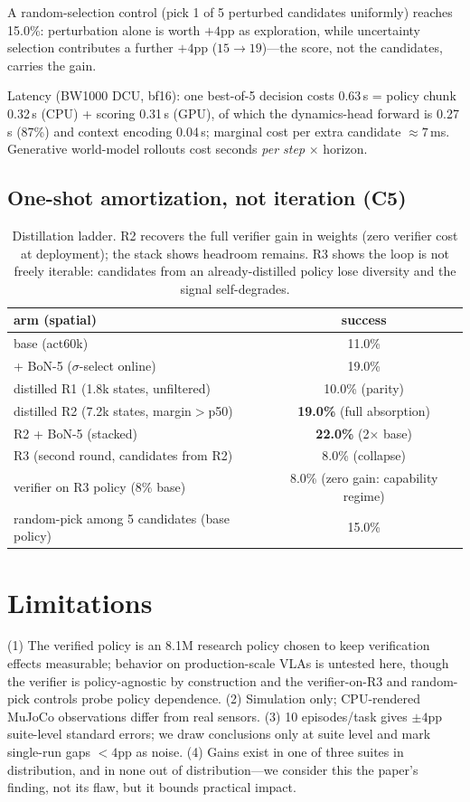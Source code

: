 \documentclass[11pt]{article}
\begin{document}
A random-selection control (pick 1 of 5 perturbed candidates uniformly) reaches 15.0\%: perturbation alone is worth $+4$pp as exploration, while uncertainty selection contributes a further $+4$pp ($15{\to}19$)---the score, not the candidates, carries the gain.

Latency (BW1000 DCU, bf16): one best-of-5 decision costs 0.63\,s = policy chunk 0.32\,s (CPU) + scoring 0.31\,s (GPU), of which the dynamics-head forward is 0.27\,s (87\%) and context encoding 0.04\,s; marginal cost per extra candidate $\approx 7$\,ms. Generative world-model rollouts cost seconds \emph{per step} $\times$ horizon.

\subsection{One-shot amortization, not iteration (C5)}
\begin{table}[h]
\centering\small
\begin{tabular}{lc}
\toprule
arm (spatial) & success \\
\midrule
base (act60k) & 11.0\% \\
+ BoN-5 ($\sigma$-select online) & 19.0\% \\
distilled R1 (1.8k states, unfiltered) & 10.0\% (parity) \\
distilled R2 (7.2k states, margin$>$p50) & \textbf{19.0\%} (full absorption) \\
R2 + BoN-5 (stacked) & \textbf{22.0\%} (2$\times$ base) \\
R3 (second round, candidates from R2) & 8.0\% (collapse) \\
verifier on R3 policy \quad(8\% base) & 8.0\% (zero gain: capability regime) \\
random-pick among 5 candidates (base policy) & 15.0\% \\
\bottomrule
\end{tabular}
\caption{Distillation ladder. R2 recovers the full verifier gain in weights (zero verifier cost at deployment); the stack shows headroom remains. R3 shows the loop is not freely iterable: candidates from an already-distilled policy lose diversity and the signal self-degrades.}
\label{tab:distill}
\end{table}

\section{Limitations}
(1) The verified policy is an 8.1M research policy chosen to keep verification effects measurable; behavior on production-scale VLAs is untested here, though the verifier is policy-agnostic by construction and the verifier-on-R3 and random-pick controls probe policy dependence. (2) Simulation only; CPU-rendered MuJoCo observations differ from real sensors. (3) 10 episodes/task gives $\pm 4$pp suite-level standard errors; we draw conclusions only at suite level and mark single-run gaps $<4$pp as noise. (4) Gains exist in one of three suites in distribution, and in none out of distribution---we consider this the paper's finding, not its flaw, but it bounds practical impact.
\end{document}
